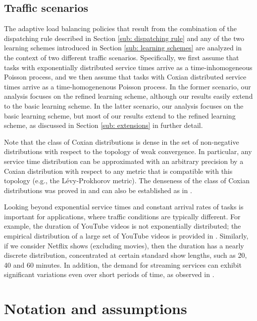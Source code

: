 \documentclass[a4paper, 12pt]{article}
\theoremstyle{definition}
\begin{document}
\subsection{Traffic scenarios}
\label{sub: traffic scenarios}

The adaptive load balancing policies that result from the combination of the dispatching rule described in Section \ref{sub: dispatching rule} and any of the two learning schemes introduced in Section \ref{sub: learning schemes} are analyzed in the context of two different traffic scenarios. Specifically, we first assume that tasks with exponentially distributed service times arrive as a time-inhomogeneous Poisson process, and we then assume that tasks with Coxian distributed service times arrive as a time-homogenenous Poisson process. In the former scenario, our analysis focuses on the refined learning scheme, although our results easily extend to the basic learning scheme. In the latter scenario, our analysis focuses on the basic learning scheme, but most of our results extend to the refined learning scheme, as discussed in Section \ref{sub: extensions} in further detail.

Note that the class of Coxian distributions is dense in the set of non-negative distributions with respect to the topology of weak convergence. In particular, any service time distribution can be approximated with an arbitrary precision by a Coxian distribution with respect to any metric that is compatible with this topology (e.g., the L\'evy-Prokhorov metric). The denseness of the class of Coxian distributions was proved in \cite{schassberger2013warteschlangen} and can also be established as in \cite[Exercise 3.3.3]{kelly2011reversibility}.

Looking beyond exponential service times and constant arrival rates of tasks is important for applications, where traffic conditions are typically different. For example, the duration of YouTube videos is not exponentially distributed; the empirical distribution of a large set of YouTube videos is provided in \cite{cheng2008statistics}. Similarly, if we consider Netflix shows (excluding movies), then the duration has a nearly discrete distribution, concentrated at certain standard show lengths, such as 20, 40 and 60 minutes. In addition, the demand for streaming services can exhibit significant variations even over short periods of time, as observed in \cite{applegate2015optimal,niu2011understanding,niu2011demand}.

\section{Notation and assumptions}
\label{sec: notation and assumptions}
\end{document}
